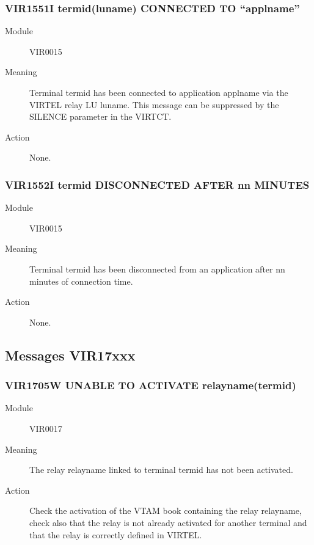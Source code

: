 \documentclass[letterpaper,10pt,english]{sphinxmanual}
\begin{document}
\subsubsection{VIR1551I termid(luname) CONNECTED TO “applname”}
\label{\detokenize{messages:vir1551i-termid-luname-connected-to-applname}}\begin{description}
\item[{Module}] \leavevmode
VIR0015

\item[{Meaning}] \leavevmode
Terminal termid has been connected to application applname via the VIRTEL relay LU luname. This message can be suppressed by the SILENCE parameter in the VIRTCT.

\item[{Action}] \leavevmode
None.

\end{description}


\subsubsection{VIR1552I termid DISCONNECTED AFTER nn MINUTES}
\label{\detokenize{messages:vir1552i-termid-disconnected-after-nn-minutes}}\begin{description}
\item[{Module}] \leavevmode
VIR0015

\item[{Meaning}] \leavevmode
Terminal termid has been disconnected from an application after nn minutes of connection time.

\item[{Action}] \leavevmode
None.

\end{description}


\subsection{Messages VIR17xxx}
\label{\detokenize{messages:messages-vir17xxx}}

\subsubsection{VIR1705W UNABLE TO ACTIVATE relayname(termid)}
\label{\detokenize{messages:vir1705w-unable-to-activate-relayname-termid}}\begin{description}
\item[{Module}] \leavevmode
VIR0017

\item[{Meaning}] \leavevmode
The relay relayname linked to terminal termid has not been activated.

\item[{Action}] \leavevmode
Check the activation of the VTAM book containing the relay relayname, check also that the relay is not already activated for another terminal and that the relay is correctly defined in VIRTEL.

\end{description}
\end{document}
